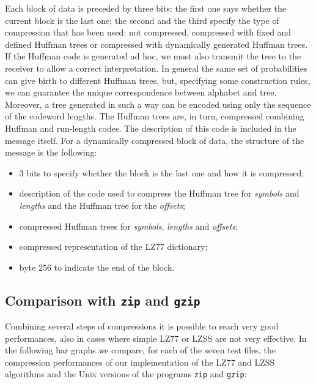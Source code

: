 Each block of data is preceded by three bits: the first one says whether the current block is the last one; the second and the third specify the type of compression that has been used: not compressed, compressed with fixed and defined Huffman trees or compressed with dynamically generated Huffman trees. If the Huffman code is generated ad hoc, we must also transmit the tree to the receiver to allow a correct interpretation. In general the same set of probabilities can give birth to different Huffman trees, but, specifying some construction rules, we can guarantee the unique correspondence between alphabet and tree. Moreover, a tree generated in such a way can be encoded using only the sequence of the codeword lengths. The Huffman trees are, in turn, compressed combining Huffman and run-length codes. The description of this code is included in the message itself. For a dynamically compressed block of data, the structure of the message is the following:
\begin{itemize}
\item
3 bits to specify whether the block is the last one and how it is compressed;

\item
description of the code used to compress the Huffman tree for \textit{symbols} and \textit{lengths} and the Huffman tree for the \textit{offsets};

\item
compressed Huffman trees for \textit{symbols}, \textit{lengths} and \textit{offsets};

\item
compressed representation of the LZ77 dictionary;

\item
byte $256$ to indicate the end of the block.
\end{itemize}

\subsection{Comparison with \texttt{zip} and \texttt{gzip}}

Combining several steps of compressions it is possible to reach very good performances, also in cases where simple LZ77 or LZSS are not very effective. In the following bar graphs we compare, for each of the seven test files, the compression performances of our implementation of the LZ77 and LZSS algorithms and the Unix versions of the programs \texttt{zip} and \texttt{gzip}:

